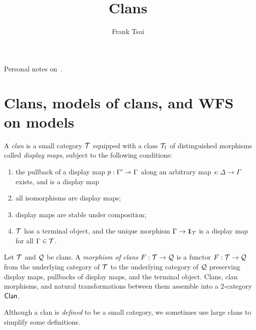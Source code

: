 \documentclass[a4paper]{article}
\title{Clans}
\author{Frank Tsai}
\begin{document}
\maketitle

Personal notes on~\cite{Frey25}.

\section{Clans, models of clans, and WFS on models}

\begin{definition}
  A \emph{clan} is a small category $\mathcal{T}$ equipped with a class $\mathcal{T}_{\dag}$ of distinguished morphisms called \emph{display maps}, subject to the following conditions:
  \begin{enumerate}
  \item the pullback of a display map $p : \Gamma' \rightarrowtriangle \Gamma$ along an arbitrary map $s : \Delta \to \Gamma$ exists, and is a display map
    \begin{center}
    \end{center}
  \item all isomorphisms are display maps;
  \item display maps are stable under composition;
  \item $\mathcal{T}$ has a terminal object, and the unique morphism $\Gamma \to \mathbf{1}_{\mathcal{T}}$ is a display map for all $\Gamma \in \mathcal{T}$.
  \end{enumerate}
\end{definition}

\begin{definition}
  Let $\mathcal{T}$ and $\mathcal{Q}$ be clans.
  A \emph{morphism of clans} $F : \mathcal{T} \to \mathcal{Q}$ is a functor $F : \mathcal{T} \to \mathcal{Q}$ from the underlying category of $\mathcal{T}$ to the underlying category of $\mathcal{Q}$ preserving display maps, pullbacks of display maps, and the terminal object.
  Clans, clan morphisms, and natural transformations between them assemble into a 2-category $\mathsf{Clan}$.
\end{definition}

\begin{remark}
  Although a clan is \emph{defined} to be a small category, we sometimes use large clans to simplify some definitions.
\end{remark}
\end{document}
